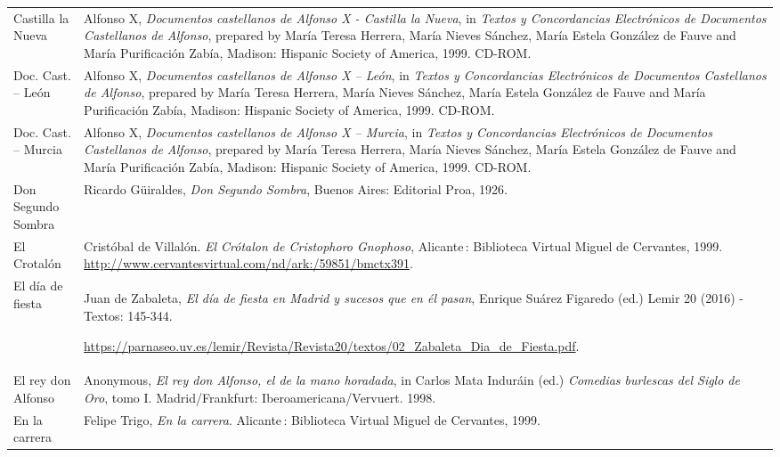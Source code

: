 \documentclass[output=paper]{langscibook}
\begin{document}
\begin{tabularx}{\textwidth}{XX}
Castilla la Nueva & Alfonso X, \textit{Documentos castellanos de Alfonso X - Castilla la Nueva}, in \textit{Textos y Concordancias Electrónicos de Documentos Castellanos de Alfonso}, prepared by María Teresa Herrera, María Nieves Sánchez, María Estela González de Fauve and María Purificación Zabía, Madison: Hispanic Society of America, 1999. CD-ROM.\\
Doc. Cast. – León & Alfonso X, \textit{Documentos castellanos de Alfonso X – León}, in \textit{Textos y Concordancias Electrónicos de Documentos Castellanos de Alfonso}, prepared by María Teresa Herrera, María Nieves Sánchez, María Estela González de Fauve and María Purificación Zabía, Madison: Hispanic Society of America, 1999. CD-ROM.\\
Doc. Cast. – Murcia & Alfonso X, \textit{Documentos castellanos de Alfonso X – Murcia}, in \textit{Textos y Concordancias Electrónicos de Documentos Castellanos de Alfonso}, prepared by María Teresa Herrera, María Nieves Sánchez, María Estela González de Fauve and María Purificación Zabía, Madison: Hispanic Society of America, 1999. CD-ROM.\\
Don Segundo Sombra & Ricardo Güiraldes, \textit{Don Segundo Sombra}, Buenos Aires: Editorial Proa, 1926.\\
El Crotalón & Cristóbal de Villalón. \textit{El Crótalon de Cristophoro Gnophoso}, Alicante : Biblioteca Virtual Miguel de Cervantes, 1999. \url{http://www.cervantesvirtual.com/nd/ark:/59851/bmctx391}.\\
El día de fiesta & Juan de Zabaleta, \textit{El día de fiesta en Madrid y sucesos que en él pasan}, Enrique Suárez Figaredo (ed.) Lemir 20 (2016) - Textos: 145-344.

\url{https://parnaseo.uv.es/lemir/Revista/Revista20/textos/02_Zabaleta_Dia_de_Fiesta.pdf}.\\
El rey don Alfonso & Anonymous, \textit{El rey don Alfonso, el de la mano horadada}, in Carlos Mata Induráin (ed.) \textit{Comedias burlescas del Siglo de Oro}, tomo I. Madrid/Frankfurt: Iberoamericana/Vervuert. 1998.\\
En la carrera & Felipe Trigo, \textit{En la carrera}. Alicante : Biblioteca Virtual Miguel de Cervantes, 1999.


\end{tabularx}
\end{document}
